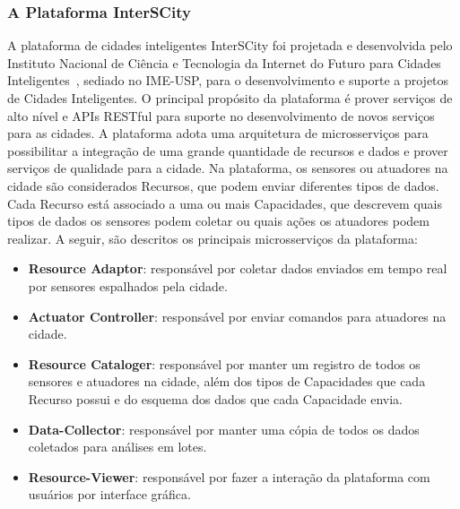 
\subsubsection{A Plataforma InterSCity}
A plataforma de cidades inteligentes InterSCity foi projetada e desenvolvida pelo Instituto Nacional de Ciência e Tecnologia da Internet do Futuro para Cidades Inteligentes~\citep{del2019design}, sediado no IME-USP, para o desenvolvimento e suporte a projetos de Cidades Inteligentes. O principal propósito da plataforma é prover serviços de alto nível e APIs RESTful para suporte no desenvolvimento de novos serviços para as cidades. A plataforma adota uma arquitetura de microsserviços para possibilitar a integração de uma grande quantidade de recursos e dados e prover serviços de qualidade para a cidade. Na plataforma, os sensores ou atuadores na cidade são considerados Recursos, que podem enviar diferentes tipos de dados. Cada Recurso está associado a uma ou mais Capacidades, que descrevem quais tipos de dados os sensores podem coletar ou quais ações os atuadores podem realizar. A seguir, são descritos os principais microsserviços da plataforma:


\begin{itemize}
\item \textbf{Resource Adaptor}: responsável por coletar dados enviados em tempo real por sensores espalhados pela cidade.
\item \textbf{Actuator Controller}: responsável por enviar comandos para atuadores na cidade.
\item \textbf{Resource Cataloger}: responsável por manter um registro de todos os sensores e atuadores na cidade, além dos tipos de Capacidades que cada Recurso possui e do esquema dos dados que cada Capacidade envia.
\item \textbf{Data-Collector}: responsável por manter uma cópia de todos os dados coletados para análises em lotes.
\item \textbf{Resource-Viewer}: responsável por fazer a interação da plataforma com usuários por interface gráfica.
\end{itemize}

